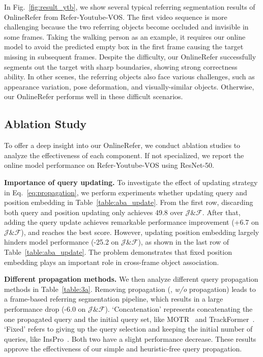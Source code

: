 \documentclass[10pt,twocolumn,letterpaper]{article}
\begin{document}
In Fig.~\ref{fig:result_ytb}, we show several typical referring segmentation results of OnlineRefer from Refer-Youtube-VOS.
The first video sequence is more challenging because the two referring objects become occluded and invisible in some frames.
Taking the walking person as an example, it requires our online model to avoid the predicted empty box in the first frame causing the target missing in subsequent frames.
Despite the difficulty, our OnlineRefer successfully segments out the target with sharp boundaries, showing strong correctness ability.
In other scenes, the referring objects also face various challenges, such as appearance variation, pose deformation, and visually-similar objects.
Otherwise, our OnlineRefer performs well in these difficult scenarios.


\subsection{Ablation Study}
\label{sec:ablation}

To offer a deep insight into our OnlineRefer, we conduct ablation studies to analyze the effectiveness of each component.
If not specialized, we report the online model performance on Refer-Youtube-VOS using ResNet-50.

\noindent\textbf{Importance of query updating.}
To investigate the effect of updating strategy in Eq.~\ref{eq:propagation}, we perform experiments whether updating query and position embedding in Table~\ref{table:aba_update}.
From the first row, discarding  both query and position updating only  achieves 49.8 over $\mathcal{J} \& \mathcal{F}$.
After that, adding the query update achieves remarkable performance improvement (+6.7 on $\mathcal{J} \& \mathcal{F}$), and reaches the best score.
However, updating position embedding largely hinders model performance (-25.2 on $\mathcal{J} \& \mathcal{F}$), as shown in the last row of  Table~\ref{table:aba_update}.
The problem demonstrates that fixed position embedding plays an important role in cross-frame object association.

\noindent\textbf{Different propagation methods.}
We then analyze different query propagation methods in Table~\ref{table:3a}.
Removing propagation (\ie, \textit{w/o} propagation) leads to a frame-based referring segmentation pipeline, which results in a large performance drop (-6.0 on $\mathcal{J} \& \mathcal{F}$).
`Concatenation' represents concatenating the one propagated query and the initial query set, like MOTR~\cite{motr} and TrackFormer~\cite{trackformer}.
`Fixed' refers to giving up the query selection and keeping the initial number of queries, like InsPro~\cite{inspro}.
Both two have a slight performance decrease.
These results approve the effectiveness of our simple and heuristic-free
query propagation.
\end{document}
